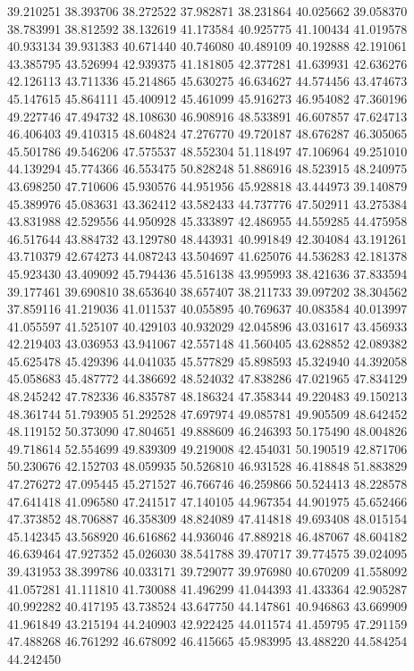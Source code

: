 39.210251
38.393706
38.272522
37.982871
38.231864
40.025662
39.058370
38.783991
38.812592
38.132619
41.173584
40.925775
41.100434
41.019578
40.933134
39.931383
40.671440
40.746080
40.489109
40.192888
42.191061
43.385795
43.526994
42.939375
41.181805
42.377281
41.639931
42.636276
42.126113
43.711336
45.214865
45.630275
46.634627
44.574456
43.474673
45.147615
45.864111
45.400912
45.461099
45.916273
46.954082
47.360196
49.227746
47.494732
48.108630
46.908916
48.533891
46.607857
47.624713
46.406403
49.410315
48.604824
47.276770
49.720187
48.676287
46.305065
45.501786
49.546206
47.575537
48.552304
51.118497
47.106964
49.251010
44.139294
45.774366
46.553475
50.828248
51.886916
48.523915
48.240975
43.698250
47.710606
45.930576
44.951956
45.928818
43.444973
39.140879
45.389976
45.083631
43.362412
43.582433
44.737776
47.502911
43.275384
43.831988
42.529556
44.950928
45.333897
42.486955
44.559285
44.475958
46.517644
43.884732
43.129780
48.443931
40.991849
42.304084
43.191261
43.710379
42.674273
44.087243
43.504697
41.625076
44.536283
42.181378
45.923430
43.409092
45.794436
45.516138
43.995993
38.421636
37.833594
39.177461
39.690810
38.653640
38.657407
38.211733
39.097202
38.304562
37.859116
41.219036
41.011537
40.055895
40.769637
40.083584
40.013997
41.055597
41.525107
40.429103
40.932029
42.045896
43.031617
43.456933
42.219403
43.036953
43.941067
42.557148
41.560405
43.628852
42.089382
45.625478
45.429396
44.041035
45.577829
45.898593
45.324940
44.392058
45.058683
45.487772
44.386692
48.524032
47.838286
47.021965
47.834129
48.245242
47.782336
46.835787
48.186324
47.358344
49.220483
49.150213
48.361744
51.793905
51.292528
47.697974
49.085781
49.905509
48.642452
48.119152
50.373090
47.804651
49.888609
46.246393
50.175490
48.004826
49.718614
52.554699
49.839309
49.219008
42.454031
50.190519
42.871706
50.230676
42.152703
48.059935
50.526810
46.931528
46.418848
51.883829
47.276272
47.095445
45.271527
46.766746
46.259866
50.524413
48.228578
47.641418
41.096580
47.241517
47.140105
44.967354
44.901975
45.652466
47.373852
48.706887
46.358309
48.824089
47.414818
49.693408
48.015154
45.142345
43.568920
46.616862
44.936046
47.889218
46.487067
48.604182
46.639464
47.927352
45.026030
38.541788
39.470717
39.774575
39.024095
39.431953
38.399786
40.033171
39.729077
39.976980
40.670209
41.558092
41.057281
41.111810
41.730088
41.496299
41.044393
41.433364
42.905287
40.992282
40.417195
43.738524
43.647750
44.147861
40.946863
43.669909
41.961849
43.215194
44.240903
42.922425
44.011574
41.459795
47.291159
47.488268
46.761292
46.678092
46.415665
45.983995
43.488220
44.584254
44.242450
